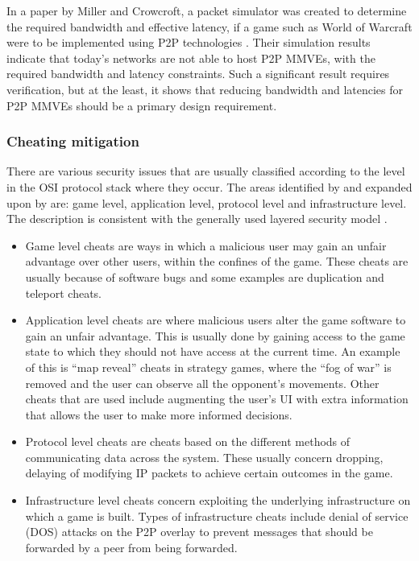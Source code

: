 In a paper by Miller and Crowcroft, a packet simulator was created to determine the required bandwidth and effective latency, if a game such as World of Warcraft were to be implemented using P2P technologies \cite{Miller_p2p_infeasability}. Their simulation results indicate that today's networks are not able to host P2P MMVEs, with the required bandwidth and latency constraints. Such a significant result requires verification, but at the least, it shows that reducing bandwidth and latencies for P2P MMVEs should be a primary design requirement.

\subsubsection{Cheating mitigation}
\label{key_challenges_cheating}

There are various security issues that are usually classified according to the level in the OSI protocol stack where they occur. The areas identified by \cite{cheat_proof_event_ordering} and expanded upon by \cite{cheating_taxonomy} are: game level, application level, protocol level and infrastructure level. The description is consistent with the generally used layered security model \cite{distributed_systems_security}.

\begin{itemize}
\item Game level cheats are ways in which a malicious user may gain an unfair advantage over other users, within the confines of the game. These cheats are usually because of software bugs and some examples are duplication and teleport cheats.

\item Application level cheats are where malicious users alter the game software to gain an unfair advantage. This is usually done by gaining access to the game state to which they should not have access at the current time. An example of this is ``map reveal'' cheats in strategy games, where the ``fog of war'' is removed and the user can observe all the opponent's movements. Other cheats that are used include augmenting the user's UI with extra information that allows the user to make more informed decisions.

\item Protocol level cheats are cheats based on the different methods of communicating data across the system. These usually concern dropping, delaying of modifying IP packets to achieve certain outcomes in the game.

\item Infrastructure level cheats concern exploiting the underlying infrastructure on which a game is built. Types of infrastructure cheats include denial of service (DOS) attacks on the P2P overlay to prevent messages that should be forwarded by a peer from being forwarded.
\end{itemize}

